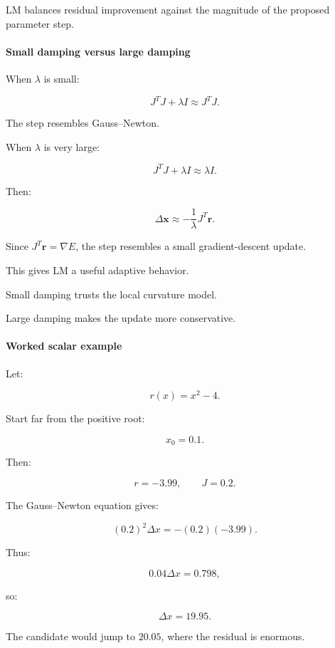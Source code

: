 LM balances residual improvement against the magnitude of the proposed parameter step.

\paragraph{Small damping versus large damping}\label{02-foundations-ii-ch027-small-damping-versus-large-damping}

\hypertarget{02-foundations-ii-ch027-small-damping-versus-large-damping}{}

When \(\lambda\) is small:

\[
J^TJ+\lambda I\approx J^TJ.
\]

The step resembles Gauss--Newton.

When \(\lambda\) is very large:

\[
J^TJ+\lambda I\approx\lambda I.
\]

Then:

\[
\Delta\mathbf x\approx-\frac1\lambda J^T\mathbf r.
\]

Since \(J^T\mathbf r=\nabla E\), the step resembles a small gradient-descent update.

This gives LM a useful adaptive behavior.

Small damping trusts the local curvature model.

Large damping makes the update more conservative.

\paragraph{Worked scalar example}\label{02-foundations-ii-ch027-worked-scalar-example}

\hypertarget{02-foundations-ii-ch027-worked-scalar-example}{}

Let:

\[
r(x)=x^2-4.
\]

Start far from the positive root:

\[
x_0=0.1.
\]

Then:

\[
r=-3.99,\qquad J=0.2.
\]

The Gauss--Newton equation gives:

\[
(0.2)^2\Delta x=-(0.2)(-3.99).
\]

Thus:

\[
0.04\Delta x=0.798,
\]

so:

\[
\boxed{\Delta x=19.95}.
\]

The candidate would jump to \(20.05\), where the residual is enormous.

